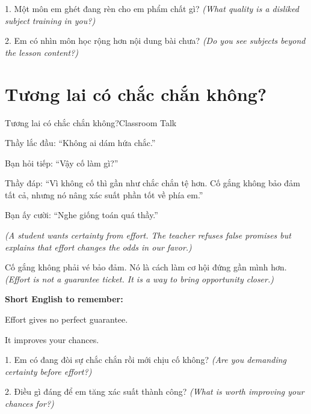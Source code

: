 \begin{tuhocnhanh}
1. Một môn em ghét đang rèn cho em phẩm chất gì? \textit{(What quality is a disliked subject training in you?)}

2. Em có nhìn môn học rộng hơn nội dung bài chưa? \textit{(Do you see subjects beyond the lesson content?)}
\end{tuhocnhanh}
\ngancach

\section{Tương lai có chắc chắn không?}
\begin{truyen}{Tương lai có chắc chắn không?}{Classroom Talk}

Thầy lắc đầu: ``Không ai dám hứa chắc.''

Bạn hỏi tiếp: ``Vậy cố làm gì?''

Thầy đáp: ``Vì không cố thì gần như chắc chắn tệ hơn. Cố gắng không bảo đảm tất cả, nhưng nó nâng xác suất phần tốt về phía em.''

Bạn ấy cười: ``Nghe giống toán quá thầy.''

\textit{(A student wants certainty from effort. The teacher refuses false promises but explains that effort changes the odds in our favor.)}
\end{truyen}

\begin{baihoc}
Cố gắng không phải vé bảo đảm. Nó là cách làm cơ hội đứng gần mình hơn.
\textit{(Effort is not a guarantee ticket. It is a way to bring opportunity closer.)}
\end{baihoc}

\begin{ghinhoanh}
\textbf{Short English to remember:}

Effort gives no perfect guarantee.

It improves your chances.
\end{ghinhoanh}

\begin{tuhocnhanh}
1. Em có đang đòi sự chắc chắn rồi mới chịu cố không? \textit{(Are you demanding certainty before effort?)}

2. Điều gì đáng để em tăng xác suất thành công? \textit{(What is worth improving your chances for?)}
\end{tuhocnhanh}
\ngancach

